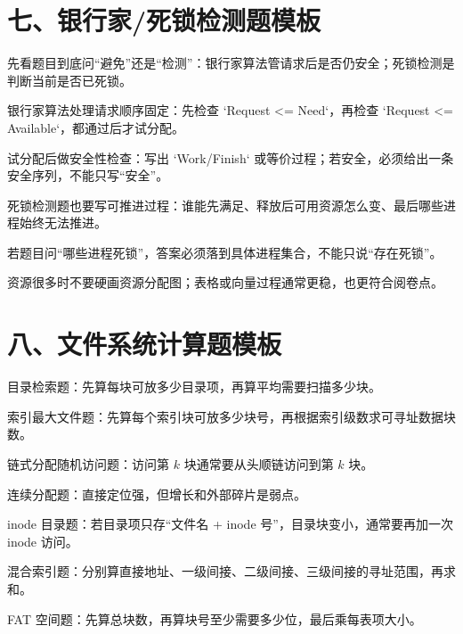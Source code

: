 \section*{七、银行家/死锁检测题模板}
{}
\begin{points}
  \item 先看题目到底问“避免”还是“检测”：银行家算法管请求后是否仍安全；死锁检测是判断当前是否已死锁。
  \item 银行家算法处理请求顺序固定：先检查 `Request <= Need`，再检查 `Request <= Available`，都通过后才试分配。
  \item 试分配后做安全性检查：写出 `Work/Finish` 或等价过程；若安全，必须给出一条安全序列，不能只写“安全”。
  \item 死锁检测题也要写可推进过程：谁能先满足、释放后可用资源怎么变、最后哪些进程始终无法推进。
  \item 若题目问“哪些进程死锁”，答案必须落到具体进程集合，不能只说“存在死锁”。
  \item 资源很多时不要硬画资源分配图；表格或向量过程通常更稳，也更符合阅卷点。
\end{points}

\section*{八、文件系统计算题模板}
{}
\begin{points}
  \item 目录检索题：先算每块可放多少目录项，再算平均需要扫描多少块。
  \item 索引最大文件题：先算每个索引块可放多少块号，再根据索引级数求可寻址数据块数。
  \item 链式分配随机访问题：访问第 $k$ 块通常要从头顺链访问到第 $k$ 块。
  \item 连续分配题：直接定位强，但增长和外部碎片是弱点。
  \item inode 目录题：若目录项只存“文件名 + inode 号”，目录块变小，通常要再加一次 inode 访问。
  \item 混合索引题：分别算直接地址、一级间接、二级间接、三级间接的寻址范围，再求和。
  \item FAT 空间题：先算总块数，再算块号至少需要多少位，最后乘每表项大小。
\end{points}

